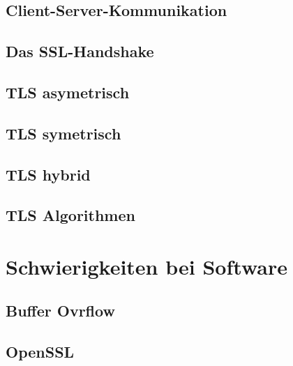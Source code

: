 \documentclass[11pt]{scrartcl}
\begin{document}
\subsection{Client-Server-Kommunikation}
\label{sec:client-server-communication}



\subsection{Das SSL-Handshake}
\label{sec:ssl-handshake}

\subsection{TLS asymetrisch}
\label{sec:tls-asymetric}

\subsection{TLS symetrisch}
\label{sec:tls-symetric}

\subsection{TLS hybrid}
\label{sec:tls-hybrid}

\subsection{TLS Algorithmen}
\label{sec:tls-algorithmen}


\section{Schwierigkeiten bei Software}
\label{sec:sw-trouble}

\subsection{Buffer Ovrflow}
\label{sec:buffer-overflow}

\subsection{OpenSSL}
\label{sec:openssl}

\newpage
\listoffigures
{}
\mbox{}
\nocite{*}


\end{document}
